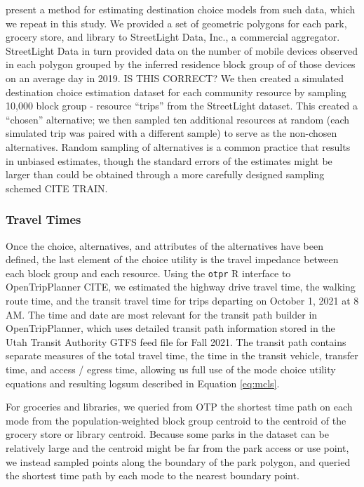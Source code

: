 \documentclass[3p, authoryear]{elsarticle} %
\begin{document}
\citet{alamedaparks} present a method for estimating destination choice models from
such data, which we repeat in this study. We provided a set of geometric
polygons for each park, grocery store, and library to StreetLight Data, Inc., a
commercial aggregator. StreetLight Data in turn provided data on the number of
mobile devices observed in each polygon grouped by the inferred residence block
group of of those devices on an average day in 2019. IS THIS CORRECT?
We then created a simulated destination choice estimation dataset for each
community resource by sampling 10,000 block group - resource ``trips'' from the
StreetLight dataset. This created a ``chosen'' alternative; we then sampled ten additional
resources at random (each simulated trip was paired with a different sample) to
serve as the non-chosen alternatives. Random sampling of alternatives is a
common practice that results in unbiased estimates, though the standard errors
of the estimates might be larger than could be obtained through a more carefully
designed sampling schemed CITE TRAIN.

\hypertarget{travel-times}{%
\subsubsection{Travel Times}\label{travel-times}}

Once the choice, alternatives, and attributes of the alternatives have been
defined, the last element of the choice utility is the travel impedance between
each block group and each resource. Using the \texttt{otpr} R interface \citep{otpr} to
OpenTripPlanner CITE, we estimated the highway drive travel time, the walking
route time, and the transit travel time for trips departing on October 1,
2021 at 8 AM. The time and date are most relevant for the transit path builder
in OpenTripPlanner, which uses detailed transit path information stored in the
Utah Transit Authority GTFS feed file for Fall 2021. The transit path contains
separate measures of the total travel time, the time in the transit vehicle,
transfer time, and access / egress time, allowing us full use of the
mode choice utility equations and resulting logsum described in Equation \eqref{eq:mcls}.

For groceries and libraries, we queried from OTP the shortest time path on each
mode from the population-weighted block group centroid to the centroid of the grocery
store or library centroid. Because some parks in the dataset can be relatively
large and the centroid might be far from the park access or use point, we instead
sampled points along the boundary of the park polygon, and queried the shortest
time path by each mode to the nearest boundary point.
\end{document}
